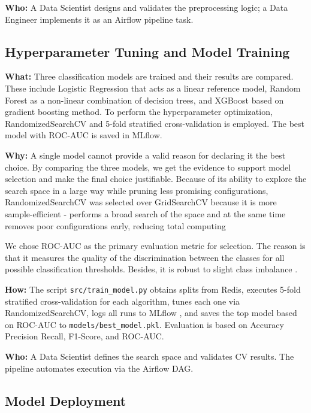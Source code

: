 \documentclass[12pt,a4paper]{article}
\begin{document}
\textbf{Who:} A Data Scientist designs and validates the preprocessing logic; a Data Engineer
implements it as an Airflow pipeline task.

\subsection{Hyperparameter Tuning and Model Training}

\textbf{What:} Three classification models are trained and their results are compared. These include Logistic Regression that acts as a linear reference model, Random Forest as a non-linear combination of decision trees, and XGBoost based on gradient boosting method.
To perform the hyperparameter optimization, RandomizedSearchCV and 5-fold stratified cross-validation is employed. The best model with ROC-AUC is saved in MLflow.

\textbf{Why:} A single model cannot provide a valid reason for declaring it the best choice. By comparing the three models, we get the evidence to support model selection and make the final choice justifiable. Because of its ability to explore the search space in a large way while pruning less promising configurations, RandomizedSearchCV was selected over GridSearchCV because it is more sample-efficient - performs a broad search of the space and at the same time removes poor configurations
early, reducing total computing \cite{pedregosa2011}

We chose ROC-AUC as the primary evaluation metric for selection. The reason is that it measures the quality of the discrimination between the classes for all possible classification thresholds. Besides, it is robust to slight class imbalance \cite{fawcett2006}.

\textbf{How:} The script \texttt{src/train\_model.py} obtains splits from Redis, executes 5-fold stratified cross-validation for each algorithm, tunes each one via RandomizedSearchCV, logs all runs to MLflow \cite{mlflow}, and saves the top model based on ROC-AUC to \texttt{models/best\_model.pkl}. Evaluation is based on Accuracy Precision Recall, F1-Score, and ROC-AUC.

\textbf{Who:} A Data Scientist defines the search space and validates CV results. The pipeline
automates execution via the Airflow DAG.

\subsection{Model Deployment}
\end{document}
